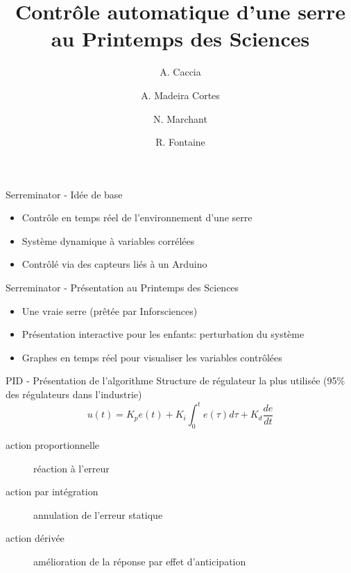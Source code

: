 \documentclass{beamer}
\title{Contrôle automatique d'une serre au Printemps des Sciences}
\date{ }
\author{A. Caccia \and A. Madeira Cortes \and N. Marchant \and R. Fontaine}
\institute{Université Libre de Bruxelles}
\begin{document}
	\maketitle

		\begin{frame}{Serreminator - Idée de base}
			\begin{itemize}
        	\item Contrôle en temps réel de l'environnement d'une serre
        	\item Système dynamique à variables corrélées
        	\item Contrôlé via des capteurs liés à un Arduino
      		\end{itemize}
		\end{frame}

		\begin{frame}{Serreminator - Présentation au Printemps des Sciences}
			\begin{itemize}
        	\item Une vraie serre (prêtée par Inforsciences)
        	\item Présentation interactive pour les enfants: perturbation du système
        	\item Graphes en temps réel pour visualiser les variables contrôlées
      		\end{itemize}
		\end{frame}

		\begin{frame}{PID - Présentation de l'algorithme}
			Structure de régulateur la plus utilisée (95\% des régulateurs dans l'industrie)
			$$u(t) = K_p e(t) + K_i \int_{0}^{t} e(\tau) d\tau + K_d \frac{de}{dt}$$
			\begin{description}
				\item[action proportionnelle] réaction à l'erreur
				\item[action par intégration] annulation de l'erreur statique
				\item[action dérivée] amélioration de la réponse par effet d'anticipation
			\end{description}
		\end{frame}
\end{document}
